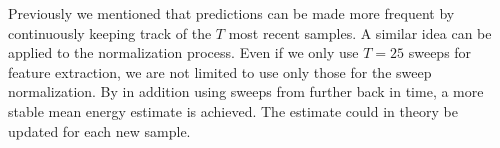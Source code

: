 Previously we mentioned that predictions can be made more frequent by continuously keeping track of the $T$ most recent samples. A similar idea can be applied to the normalization process. Even if we only use $T=25$ sweeps for feature extraction, we are not limited to use only those for the sweep normalization. By in addition using sweeps from further back in time, a more stable mean energy estimate is achieved. The estimate could in theory be updated for each new sample.






